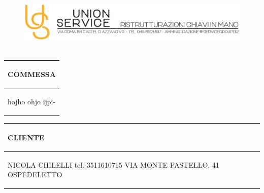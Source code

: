 \documentclass[a4paper]{article}
\begin{document}
                                \begin{figure}[!t]
                                \includegraphics[width=15.8cm, height=3cm]{intestazioneAlta2.jpg}
                                \end{figure}

                                \noindent\begin{tabular}{| L{72.2mm} |}
                                    \hline
                                    \vspace{2.5mm}
                                    \begin{spacing}{0}
                                    \textbf{COMMESSA}
                                    \end{spacing}\\
                                    \hline
                                    \vspace{4mm}
                                    \begin{spacing}{1.2}

                                hojho \newline ohjo \newline ijpi\newline -
                                  \end{spacing}\\
                                    \hline
                                  \end{tabular}
                                  \quad
                                  \begin{tabular}{ | R{72.2mm} | }
                                    \hline
                                    \vspace{2.5mm}
                                    \begin{spacing}{0}
                                    \textbf{CLIENTE}
                                    \end{spacing}\\
                                    \hline
                                    \vspace{4mm}
                                    \begin{spacing}{1.2}

                               NICOLA CHILELLI \newline tel. 3511610715 \newline VIA MONTE PASTELLO, 41 OSPEDELETTO
                                  \end{spacing}\\
                                    \hline
                                  \end{tabular}
\end{document}
